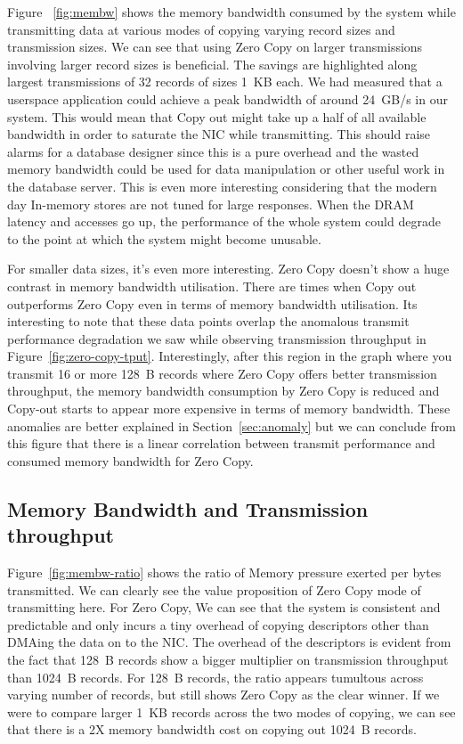 Figure ~\ref{fig:membw} shows the memory bandwidth consumed by the system while transmitting data at various modes 
of copying varying record sizes and transmission sizes. We can see that using Zero Copy on larger transmissions involving 
larger record sizes is beneficial. The savings are highlighted along largest transmissions of 32 records of sizes 1~KB each. 
 We had measured that a userspace application could achieve a peak bandwidth of around 24~GB/s in our system. This would mean that Copy out 
 might take up a half of all available bandwidth in order to saturate the NIC while transmitting. This should raise alarms for a database 
 designer since this is a pure overhead and the wasted memory bandwidth could be used for data manipulation or other useful work in the database 
 server. This is even more interesting considering that the modern day In-memory stores are not tuned for large responses.
  When the DRAM latency and accesses go up, the performance of the whole system could degrade to the point at which the system might become unusable.


For smaller data sizes, it's even more interesting. Zero Copy doesn't show a huge contrast in memory bandwidth utilisation. There are times 
when Copy out outperforms Zero Copy even in terms of memory bandwidth utilisation. Its interesting to note that these data points overlap the anomalous transmit performance 
degradation we saw while observing transmission throughput in Figure~\ref{fig:zero-copy-tput}. Interestingly, after this region in the graph 
where you transmit 16 or more 128~B records where Zero Copy offers better transmission throughput, the memory bandwidth consumption by Zero Copy 
is reduced and Copy-out starts to appear more expensive in terms of memory bandwidth. These anomalies are better explained in Section~\ref{sec:anomaly} but we 
can conclude from this figure that there is a linear correlation between transmit performance and consumed memory bandwidth for Zero Copy.



\subsection{Memory Bandwidth and Transmission throughput}
\label{sec:membw-savings}
Figure~\ref{fig:membw-ratio} shows the ratio of Memory pressure exerted per bytes transmitted. We can clearly see the value proposition of 
Zero Copy mode of transmitting here. For Zero Copy, We can see that the system is consistent and predictable and only incurs a tiny overhead of 
copying descriptors other than DMAing the data on to the NIC. The overhead of the descriptors is evident from the fact that 128~B records show 
a bigger multiplier on transmission throughput than 1024~B records. For 128~B records, the ratio appears tumultous across varying number of records, 
 but still shows Zero Copy as the clear winner. If we were to compare larger 1~KB records across the two modes of copying, we can see that there is a 
 2X memory bandwidth cost on copying out 1024~B records. 



